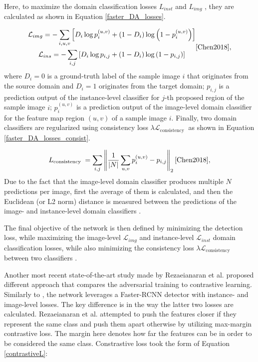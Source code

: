 \documentclass[english, 12pt, a4paper, elec, utf8, a-1b, online]{aaltothesis}
\begin{document}
Here, to maximize the domain classification losses $L_{inst}$ and $L_{img}$ , they are calculated as shown in Equation \ref{faster_DA_losses}. 

\begin{equation}
\label{faster_DA_losses} 
\begin{gathered}
\mathcal{L}_{i m g}=-\sum_{i, u, v}\left[D_{i} \log p_{i}^{(u, v)}+\left(1-D_{i}\right) \log \left(1-p_{i}^{(u, v)}\right)\right] \\ 
\mathcal{L}_{i n s} = -\sum_{i, j}\left[D_{i} \log p_{i, j}+\left(1-D_{i}\right) \log \left(1-p_{i, j}\right)\right]
\end{gathered}
\cite{Chen2018}, 
\end{equation}
where $D_i=0$ is a ground-truth label of the sample image $i$ that originates from  the source domain and $D_i=1$ originates from the target domain; $p_{i,j}$ is a prediction output of the instance-level classifier for $j$-th proposed region of the sample image $i$; $p_{i}^{(u, v)}$ is a prediction output of the image-level domain classifier for the feature map region $(u,v)$ of a sample image $i$. 
Finally, two domain classifiers are regularized using consistency loss $\lambda \mathcal{L}_{\text {consistency }}$ as shown in Equation \ref{faster_DA_losses_consist}.  

\begin{equation}
\label{faster_DA_losses_consist} 
L_{\text {consistency }}=\sum_{i, j}\left\|\frac{1}{|N|} \sum_{u, v} p_{i}^{(u, v)}-p_{i, j}\right\|_{2}
\cite{Chen2018}, 
\end{equation}
Due to the fact that the image-level domain classifier produces multiple $N$ predictions per image, first the average of them is calculated, and then the Euclidean (or L2 norm) distance is measured between the predictions of the image- and instance-level domain classifiers \cite{Chen2018} . 

The final objective of the network is then defined by minimizing the detection loss, while maximizing the image-level $\mathcal{L}_{img}$ and instance-level $\mathcal{L}_{inst}$ domain classification losses, while also minimizing the consistency loss $\lambda \mathcal{L}_{\text {consistency }}$ between two classifiers \cite{Chen2018}.

Another most recent state-of-the-art study made by Rezaeianaran et al. \cite{Rezaeianaran2021} proposed different approach that compares the adversarial training to contrastive learning. Similarly to \cite{Chen2018}, the network leverages a Faster-RCNN detector with instance- and image-level losses. The key difference is in the way the latter two losses are calculated. Rezaeianaran et al. attempted to push the features closer if they represent the same class and push them apart otherwise by utilizing max-margin contrastive loss. The margin here denotes how far the features can be in order to be considered the same class. Constrastive loss took the form of Equation \ref{contrastiveL}:
\end{document}
